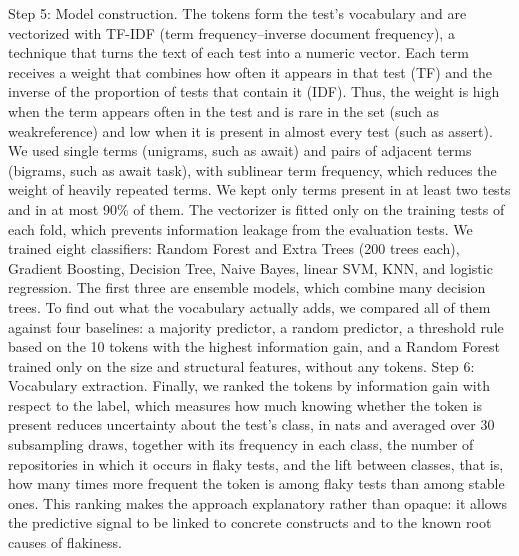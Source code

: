 Step 5: Model construction. The tokens form the test's vocabulary and are vectorized with TF-IDF (term frequency--inverse document frequency), a technique that turns the text of each test into a numeric vector. Each term receives a weight that combines how often it appears in that test (TF) and the inverse of the proportion of tests that contain it (IDF). Thus, the weight is high when the term appears often in the test and is rare in the set (such as weakreference) and low when it is present in almost every test (such as assert). We used single terms (unigrams, such as await) and pairs of adjacent terms (bigrams, such as await task), with sublinear term frequency, which reduces the weight of heavily repeated terms. We kept only terms present in at least two tests and in at most 90\% of them. The vectorizer is fitted only on the training tests of each fold, which prevents information leakage from the evaluation tests. We trained eight classifiers: Random Forest and Extra Trees (200 trees each), Gradient Boosting, Decision Tree, Naive Bayes, linear SVM, KNN, and logistic regression. The first three are ensemble models, which combine many decision trees. To find out what the vocabulary actually adds, we compared all of them against four baselines: a majority predictor, a random predictor, a threshold rule based on the 10 tokens with the highest information gain, and a Random Forest trained only on the size and structural features, without any tokens.
Step 6: Vocabulary extraction. Finally, we ranked the tokens by information gain with respect to the label, which measures how much knowing whether the token is present reduces uncertainty about the test's class, in nats and averaged over 30 subsampling draws, together with its frequency in each class, the number of repositories in which it occurs in flaky tests, and the lift between classes, that is, how many times more frequent the token is among flaky tests than among stable ones. This ranking makes the approach explanatory rather than opaque: it allows the predictive signal to be linked to concrete constructs and to the known root causes of flakiness.